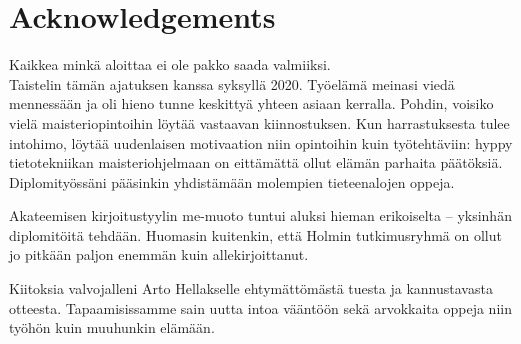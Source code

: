 \documentclass[12pt,a4paper,oneside,pdftex]{report}
\begin{document}
\startcoverpage









\chapter*{Acknowledgements}

Kaikkea minkä aloittaa ei ole pakko saada valmiiksi.\\

\noindent Taistelin tämän ajatuksen kanssa syksyllä 2020. Työelämä meinasi viedä mennessään ja oli hieno tunne keskittyä yhteen asiaan kerralla. Pohdin, voisiko vielä maisteriopintoihin löytää vastaavan kiinnostuksen. Kun harrastuksesta tulee intohimo, löytää uudenlaisen motivaation niin opintoihin kuin työtehtäviin: hyppy tietotekniikan maisteriohjelmaan on eittämättä ollut elämän parhaita päätöksiä. Diplomityössäni pääsinkin yhdistämään molempien tieteenalojen oppeja. 

Akateemisen kirjoitustyylin me-muoto tuntui aluksi hieman erikoiselta – yksinhän diplomitöitä tehdään. Huomasin kuitenkin, että Holmin tutkimusryhmä on ollut jo pitkään paljon enemmän kuin allekirjoittanut.

Kiitoksia valvojalleni Arto Hellakselle ehtymättömästä tuesta ja kannustavasta otteesta. Tapaamisissamme sain uutta intoa vääntöön sekä arvokkaita oppeja niin työhön kuin muuhunkin elämään.
\end{document}
